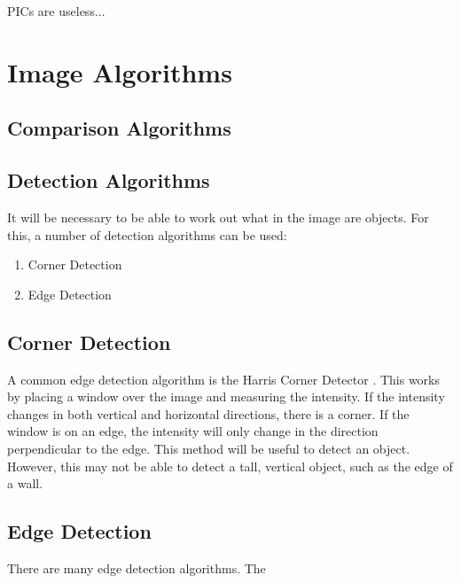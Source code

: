 PICs are useless...
\section{Image Algorithms}

\subsection{Comparison Algorithms} 

\subsection{Detection Algorithms}
It will be necessary to be able to work out what in the image are objects. For this, a number of detection algorithms can be used:
\begin{enumerate}
\item Corner Detection
\item Edge Detection
\end{enumerate}

\subsection{Corner Detection}

A common edge detection algorithm is the Harris Corner Detector \cite{Nixon:HarrisAlgo}. This works by placing a window over the image and measuring the intensity. If the intensity changes in both vertical and horizontal directions, there is a corner. If the window is on an edge, the intensity will only change in the direction perpendicular to the edge. This method will be useful to detect an object. However, this may not be able to detect a tall, vertical object, such as the edge of a wall.

\subsection{Edge Detection}
There are many edge detection algorithms. The 


